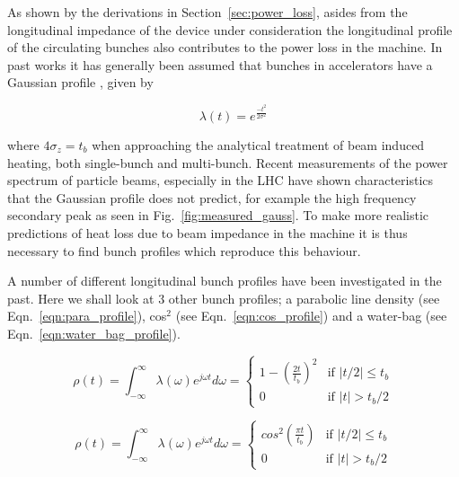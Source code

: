 As shown by the derivations in Section~\ref{sec:power_loss}, asides from the longitudinal impedance of the device under consideration the longitudinal profile of the circulating bunches also contributes to the power loss in the machine. In past works it has generally been assumed that bunches in accelerators have a Gaussian profile \cite{Grudiev:LongTransSecCol}, given by

\begin{equation}
\lambda \left( t \right) = e^{\frac{-t^{2}}{2\sigma^{2}}}
\label{eqn:gauss}
\end{equation}

where $4\sigma_{z} = t_{b}$ when approaching the analytical treatment of beam induced heating, both single-bunch and multi-bunch. Recent measurements of the power spectrum of particle beams, especially in the LHC \cite{Baudrenghien:LHCPowSpec} have shown characteristics that the Gaussian profile does not predict, for example the high frequency secondary peak as seen in Fig.~\ref{fig:measured_gauss}. To make more realistic predictions of heat loss due to beam impedance in the machine it is thus necessary to find bunch profiles which reproduce this behaviour.

A number of different longitudinal bunch profiles have been investigated in the past. Here we shall look at 3 other bunch profiles; a parabolic line density (see Eqn.~\ref{eqn:para_profile}), cos$^{2}$ (see Eqn.~\ref{eqn:cos_profile}) and a water-bag (see Eqn.~\ref{eqn:water_bag_profile}).

\begin{equation}
\rho\left( t \right) = \int^{\infty}_{-\infty} \lambda \left( \omega \right) e^{j\omega t} d\omega = 
\begin{cases}1-\left( \frac{2t} {t_{b}} \right)^{2} &\textrm{if $| t/2 | \leq t_{b}$}\\
0								&\textrm{if $| t | > t_{b}/2$}
\end{cases}
\label{eqn:para_profile}
\end{equation}

\begin{equation}
\rho\left( t \right) = \int^{\infty}_{-\infty} \lambda \left( \omega \right) e^{j\omega t} d\omega = 
\begin{cases}
cos^{2}\left( \frac{\pi t} {t_{b}} \right) &\textrm{if $| t/2 | \leq t_{b}$}\\
0								&\textrm{if $| t | > t_{b}/2$}
\end{cases}
\label{eqn:cos_profile}
\end{equation}

